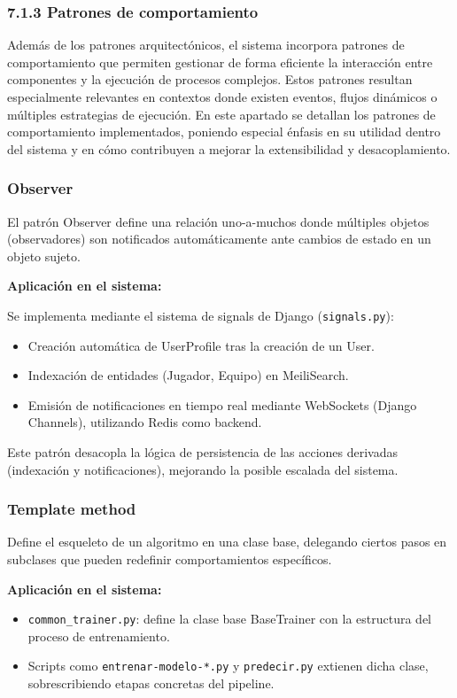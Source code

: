 \subsubsection{7.1.3 Patrones de comportamiento}
Además de los patrones arquitectónicos, el sistema incorpora patrones de
comportamiento que permiten gestionar de forma eficiente la interacción entre
componentes y la ejecución de procesos complejos. Estos patrones resultan
especialmente relevantes en contextos donde existen eventos, flujos dinámicos o
múltiples estrategias de ejecución.
En este apartado se detallan los patrones de comportamiento implementados,
poniendo especial énfasis en su utilidad dentro del sistema y en cómo
contribuyen a mejorar la extensibilidad y desacoplamiento.


\subsubsection{Observer}

El patrón Observer define una relación uno-a-muchos donde múltiples objetos
(observadores) son notificados automáticamente ante cambios de estado en un
objeto sujeto.

\textbf{Aplicación en el sistema:}

Se implementa mediante el sistema de signals de Django (\texttt{signals.py}):
\begin{itemize}
\item Creación automática de UserProfile tras la creación de un User.
\item Indexación de entidades (Jugador, Equipo) en MeiliSearch.
\item Emisión de notificaciones en tiempo real mediante WebSockets (Django
Channels), utilizando Redis como backend.
\end{itemize}

Este patrón desacopla la lógica de persistencia de las acciones derivadas
(indexación y notificaciones), mejorando la posible escalada del sistema.

\subsubsection{Template method}

Define el esqueleto de un algoritmo en una clase base, delegando ciertos pasos
en subclases que pueden redefinir comportamientos específicos.

\textbf{Aplicación en el sistema:}
\begin{itemize}
\item \texttt{common\_trainer.py}: define la clase base BaseTrainer con la
estructura del proceso de entrenamiento.
\item Scripts como \texttt{entrenar-modelo-*.py} y \texttt{predecir.py}
extienen dicha clase, sobrescribiendo etapas concretas del pipeline.
\end{itemize}

